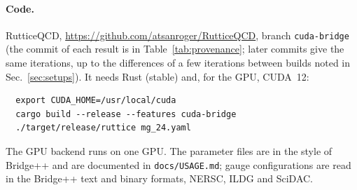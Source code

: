 \paragraph{Code.} RutticeQCD, \url{https://github.com/atsanroger/RutticeQCD}, branch
\texttt{cuda-bridge} (the commit of each result is in Table~\ref{tab:provenance}; later commits
give the same iterations, up to the differences of a few iterations between builds noted in
Sec.~\ref{sec:setups}). It needs Rust (stable) and, for the GPU, CUDA~12:
{\small
\begin{verbatim}
  export CUDA_HOME=/usr/local/cuda
  cargo build --release --features cuda-bridge
  ./target/release/ruttice mg_24.yaml
\end{verbatim}}
The GPU backend runs on one GPU. The parameter files are in the style of Bridge++
and are documented in \texttt{docs/USAGE.md}; gauge configurations are read in the
Bridge++ text and binary formats, NERSC, ILDG and SciDAC.

